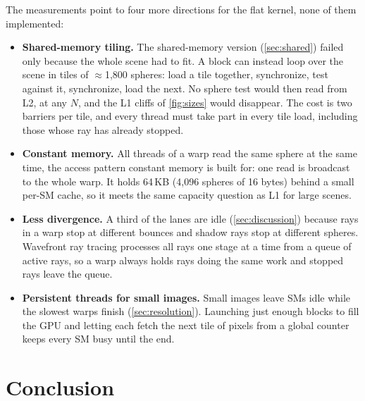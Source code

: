 \documentclass[11pt,a4paper]{article}
\begin{document}
The measurements point to four more directions for the flat kernel, none of them implemented:
\begin{itemize}[nosep]
  \item \textbf{Shared-memory tiling.} The shared-memory version (\cref{sec:shared}) failed only
        because the whole scene had to fit. A block can instead loop over the scene in tiles of
        $\approx$1,800 spheres: load a tile together, synchronize, test against it, synchronize, load
        the next. No sphere test would then read from L2, at any $N$, and the L1 cliffs of
        \cref{fig:sizes} would disappear. The cost is two barriers per tile, and every thread must
        take part in every tile load, including those whose ray has already stopped.
  \item \textbf{Constant memory.} All threads of a warp read the same sphere at the same time, the
        access pattern constant memory is built for: one read is broadcast to the whole warp. It holds
        64\,KB (4,096 spheres of 16 bytes) behind a small per-SM cache, so it meets the same capacity
        question as L1 for large scenes.
  \item \textbf{Less divergence.} A third of the lanes are idle (\cref{sec:discussion}) because rays
        in a warp stop at different bounces and shadow rays stop at different spheres. Wavefront ray
        tracing processes all rays one stage at a time from a queue of active rays, so a warp always
        holds rays doing the same work and stopped rays leave the queue.
  \item \textbf{Persistent threads for small images.} Small images leave SMs idle while the slowest
        warps finish (\cref{sec:resolution}). Launching just enough blocks to fill the GPU and letting
        each fetch the next tile of pixels from a global counter keeps every SM busy until the end.
\end{itemize}

\section{Conclusion}
\label{sec:conclusion}
\end{document}
